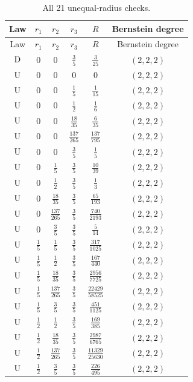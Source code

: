 \begin{longtable}{@{}cccccc@{}}
\caption{All 21 unequal-radius checks.}\label{ht:meantable}\\
\toprule Law & \(r_1\)&\(r_2\)&\(r_3\)&\(R\)& Bernstein degree\\\midrule\endfirsthead
\toprule Law & \(r_1\)&\(r_2\)&\(r_3\)&\(R\)& Bernstein degree\\\midrule\endhead
\bottomrule\endfoot
\(\mathrm D\) & \(0\) & \(0\) & \(\frac{3}{5}\) & \(\frac{3}{25}\) & \((2,2,2)\)\\
\(\mathrm U\) & \(0\) & \(0\) & \(0\) & \(0\) & \((2,2,2)\)\\
\(\mathrm U\) & \(0\) & \(0\) & \(\frac{1}{5}\) & \(\frac{1}{15}\) & \((2,2,2)\)\\
\(\mathrm U\) & \(0\) & \(0\) & \(\frac{1}{2}\) & \(\frac{1}{6}\) & \((2,2,2)\)\\
\(\mathrm U\) & \(0\) & \(0\) & \(\frac{18}{35}\) & \(\frac{6}{35}\) & \((2,2,2)\)\\
\(\mathrm U\) & \(0\) & \(0\) & \(\frac{137}{265}\) & \(\frac{137}{795}\) & \((2,2,2)\)\\
\(\mathrm U\) & \(0\) & \(0\) & \(\frac{3}{5}\) & \(\frac{1}{5}\) & \((2,2,2)\)\\
\(\mathrm U\) & \(0\) & \(\frac{1}{5}\) & \(\frac{3}{5}\) & \(\frac{10}{39}\) & \((2,2,2)\)\\
\(\mathrm U\) & \(0\) & \(\frac{1}{2}\) & \(\frac{3}{5}\) & \(\frac{1}{3}\) & \((2,2,2)\)\\
\(\mathrm U\) & \(0\) & \(\frac{18}{35}\) & \(\frac{3}{5}\) & \(\frac{65}{193}\) & \((2,2,2)\)\\
\(\mathrm U\) & \(0\) & \(\frac{137}{265}\) & \(\frac{3}{5}\) & \(\frac{740}{2193}\) & \((2,2,2)\)\\
\(\mathrm U\) & \(0\) & \(\frac{3}{5}\) & \(\frac{3}{5}\) & \(\frac{5}{14}\) & \((2,2,2)\)\\
\(\mathrm U\) & \(\frac{1}{5}\) & \(\frac{1}{5}\) & \(\frac{3}{5}\) & \(\frac{317}{1025}\) & \((2,2,2)\)\\
\(\mathrm U\) & \(\frac{1}{5}\) & \(\frac{1}{2}\) & \(\frac{3}{5}\) & \(\frac{167}{440}\) & \((2,2,2)\)\\
\(\mathrm U\) & \(\frac{1}{5}\) & \(\frac{18}{35}\) & \(\frac{3}{5}\) & \(\frac{2956}{7725}\) & \((2,2,2)\)\\
\(\mathrm U\) & \(\frac{1}{5}\) & \(\frac{137}{265}\) & \(\frac{3}{5}\) & \(\frac{22429}{58525}\) & \((2,2,2)\)\\
\(\mathrm U\) & \(\frac{1}{5}\) & \(\frac{3}{5}\) & \(\frac{3}{5}\) & \(\frac{451}{1125}\) & \((2,2,2)\)\\
\(\mathrm U\) & \(\frac{1}{2}\) & \(\frac{1}{2}\) & \(\frac{3}{5}\) & \(\frac{169}{385}\) & \((2,2,2)\)\\
\(\mathrm U\) & \(\frac{1}{2}\) & \(\frac{18}{35}\) & \(\frac{3}{5}\) & \(\frac{2987}{6765}\) & \((2,2,2)\)\\
\(\mathrm U\) & \(\frac{1}{2}\) & \(\frac{137}{265}\) & \(\frac{3}{5}\) & \(\frac{11329}{25630}\) & \((2,2,2)\)\\
\(\mathrm U\) & \(\frac{1}{2}\) & \(\frac{3}{5}\) & \(\frac{3}{5}\) & \(\frac{226}{495}\) & \((2,2,2)\)\\
\end{longtable}

